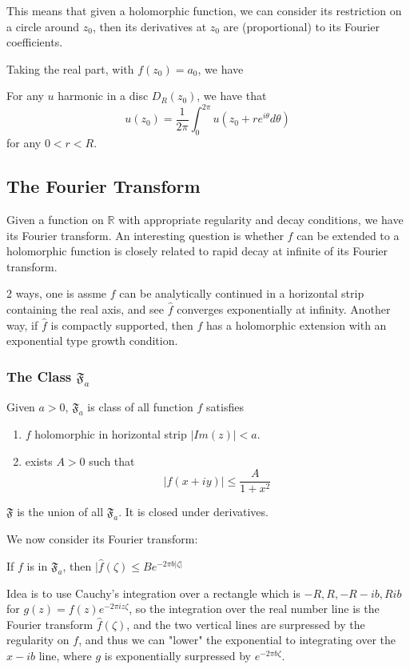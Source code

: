 \documentclass[main.tex]{subfiles}
\newcommand{\F}[1]{
\mathfrak{F}_{#1}}
\begin{document}
This means that given a holomorphic function, we can consider its restriction on a circle around $z_0$, then its derivatives at $z_0$ are (proportional) to its Fourier coefficients.

Taking the real part, with $f(z_0) = a_0$, we have 
\begin{corollary}
For any $u$ harmonic in a disc $D_R(z_0)$, we have that 
$$
u(z_0) = \frac{1}{2\pi}\int_0 ^{2\pi} u(z_0 + re^{i \theta} d\theta)
$$
for any $0 < r < R$.
\end{corollary}

\subsection{The Fourier Transform}
Given a function on $\mathbb{R}$ with appropriate regularity and decay conditions, we have its Fourier transform. An interesting question is whether $f$ can be extended to a holomorphic function is closely related to rapid decay at infinite of its Fourier transform.

2 ways, one is assme $f$ can be analytically continued in a horizontal strip containing the real axis, and see $\hat{f}$ converges exponentially at infinity. Another way, if $\hat{f}$ is compactly supported, then $f$ has a holomorphic extension with an exponential type growth condition.

\subsubsection{The Class $\F{a}$}
\begin{definition}
Given $a > 0$, $\F{a}$ is class of all function $f$ satisfies
\begin{enumerate}
    \item $f$ holomorphic in horizontal strip $|Im(z)| < a$.
    \item exists $A> 0$ such that 
    $$
    |f(x+iy)| \leq \frac{A}{1 + x^2}
    $$
\end{enumerate}
\end{definition}
$\mathfrak{F}$ is the union of all $\F{a}$. It is closed under derivatives. 

We now consider its Fourier transform:
\begin{theorem}
If $f$ is in $\F{a}$, then $|\hat{f}(\zeta) \leq B e^{-2 \pi b |\zeta|}$
\end{theorem}

Idea is to use Cauchy's integration over a rectangle which is $-R, R, -R-ib, R  ib$ for $g(z) = f(z) e^{-2\pi i z \zeta}$, 
so the integration over the real number line is
the Fourier transform $\hat{f}(\zeta)$, and the two vertical lines are surpressed by the regularity on $f$, and thus we can "lower" the exponential to integrating over the $x -ib $ line, where $g$ is exponentially surpressed by $e^{-2 \pi b \zeta}$.
\end{document}
